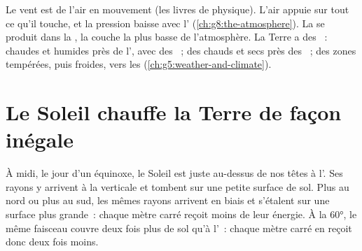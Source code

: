 \begin{recall}
Le vent est de l'air en mouvement (les livres de physique). L'air appuie
sur tout ce qu'il touche, et la pression baisse avec l'
(\cref{ch:g8:the-atmosphere}). La  se produit dans la , la
couche la plus basse de l'atmosphère. La Terre a des ~:
chaudes et humides près de l', avec des ~; des  chauds et secs près des ~; des zones
tempérées, puis froides, vers les  (\cref{ch:g5:weather-and-climate}).
\end{recall}

\section{Le Soleil chauffe la Terre de façon inégale}

À midi, le jour d'un équinoxe, le Soleil est juste au-dessus de nos têtes
à l'. Ses rayons y arrivent à la verticale et tombent sur une
petite surface de sol. Plus au nord ou plus au sud, les mêmes rayons
arrivent en biais et s'étalent sur une surface plus grande~: chaque mètre
carré reçoit moins de leur énergie. À la  \ang{60}, le même
faisceau couvre deux fois plus de sol qu'à l'~: chaque mètre carré
en reçoit donc deux fois moins.

